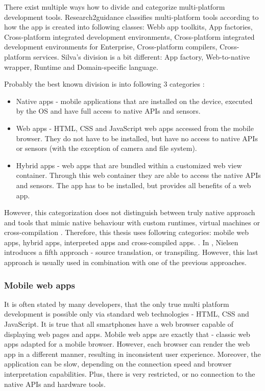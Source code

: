 \documentclass[english,master,public,dept460,male,cpdeclaration,oneside]{diploma}
\begin{document}
There exist multiple ways how to divide and categorize multi-platform development tools. Research2guidance \cite{cptBenchmarking2014} classifies multi-platform tools according to how the app is created into following classes: Webb app toolkits, App factories, Cross-platform integrated development environments, Cross-platform integrated development environments for Enterprise, Cross-platform compilers, Cross-platform services. Silva’s division \cite{ribeiroDaSilva} is a bit different: App factory, Web-to-native wrapper, Runtime and Domain-specific language.

Probably the best known division is into following 3 categories \cite{aComparativeStudy} \cite{smutny} \cite{taxonomyCP}:
\begin{itemize}
	\item Native apps - mobile applications that are installed on the device, executed by the OS and have full access to native APIs and sensors.
	\item Web apps - HTML, CSS and JavaScript web apps accessed from the mobile browser. They do not have to be installed, but have no access to native APIs or sensors (with the exception of camera and file system).
	\item Hybrid apps - web apps that are bundled within a customized web view container. Through this web container they are able to access the native APIs and sensors. The app has to be installed, but provides all benefits of a web app.
\end{itemize}

However, this categorization does not distinguish between truly native approach and tools that mimic native behaviour with custom runtimes, virtual machines or cross-compilation \cite{definingTelerik}. Therefore, this thesis uses following categories: mobile web apps, hybrid apps, interpreted apps and cross-compiled apps. \cite{uppsala}\cite{rajTolety}\cite{evaluationOfCP}. In \cite{aarhus}, Nielsen introduces a fifth approach - source translation, or transpiling. However, this last approach is usually used in combination with one of the previous approaches.

\subsubsection{Mobile web apps}
It is often stated by many developers, that the only true multi platform development is possible only via standard web technologies - HTML, CSS and JavaScript. It is true that all smartphones have a web browser capable of displaying web pages and apps. Mobile web apps are exactly that - classic web apps adapted for a mobile browser. However, each browser can render the web app in a different manner, resulting in inconsistent user experience. Moreover, the application can be slow, depending on the connection speed and browser interpretation capabilities. Plus, there is very restricted, or no connection to the native APIs and hardware tools.
\end{document}
